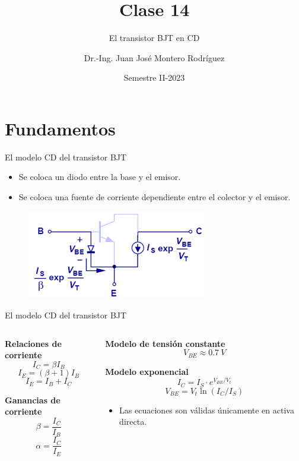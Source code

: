 \documentclass[t,aspectratio=169]{beamer}
\title{Clase 14}
\subtitle{El transistor BJT en CD}
\author{Dr.-Ing. Juan José Montero Rodríguez}
\institute{Escuela de Ingeniería Electrónica}
\date{Semestre II-2023}
\begin{document}
\begin{frame}{}
\maketitle
\end{frame}


\section{Fundamentos}
\begin{frame}{El modelo CD del transistor BJT}
\begin{itemize}
    \item Se coloca un diodo entre la base y el emisor.
    \item Se coloca una fuente de corriente dependiente entre el colector y el emisor.
\end{itemize}

\begin{figure}
    \centering
    \includegraphics[width=0.7\textwidth]{figures/modelo_cd_bjt.png}
\end{figure}

\end{frame}


\begin{frame}{El modelo CD del transistor BJT}

\begin{columns}
\begin{column}{0.5\textwidth}
\centering
\textbf{Relaciones de corriente}
\[ I_C = \beta I_B \]
\[ I_E = (\beta + 1) I_B \]
\[ I_E = I_B + I_C \]

\textbf{Ganancias de corriente}
\[ \beta = \dfrac{I_C}{I_B} \]
\[ \alpha = \dfrac{I_C}{I_E} \]

\end{column}
\begin{column}{0.5\textwidth}
\centering
\textbf{Modelo de tensión constante}
\[ V_{BE} \approx 0.7\ V \]

\textbf{Modelo exponencial}
\[ I_C = I_S \cdot e^{V_{BE}/V_t} \]
\[ V_{BE} = V_t \ln (I_C / I_S) \]

\flushleft
\begin{itemize}
    \item Las ecuaciones son válidas únicamente en activa directa.
\end{itemize}

\end{column}
\end{columns}

\end{frame}
\end{document}
